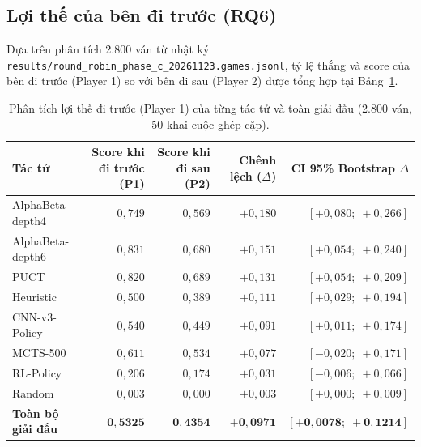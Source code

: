 \documentclass[11pt, a4paper]{article}
\begin{document}
\subsection{Lợi thế của bên đi trước (RQ6)}
Dựa trên phân tích 2.800 ván từ nhật ký \texttt{results/round\_robin\_phase\_c\_20261123.games.jsonl}, tỷ lệ thắng và score của bên đi trước (Player 1) so với bên đi sau (Player 2) được tổng hợp tại Bảng~\ref{tab:first_mover}.

\begin{table}[H]
    \centering
    \caption{Phân tích lợi thế đi trước (Player 1) của từng tác tử và toàn giải đấu (2.800 ván, 50 khai cuộc ghép cặp).}
    \label{tab:first_mover}
    \begin{tabular}{@{} l r r r r @{}}
        \toprule
        \textbf{Tác tử} & \textbf{Score khi đi trước (P1)} & \textbf{Score khi đi sau (P2)} & \textbf{Chênh lệch ($\Delta$)} & \textbf{CI 95\% Bootstrap $\Delta$} \\
        \midrule
        AlphaBeta-depth4 & $0{,}749$ & $0{,}569$ & $+0{,}180$ & $[+0{,}080;\; +0{,}266]$ \\
        AlphaBeta-depth6 & $0{,}831$ & $0{,}680$ & $+0{,}151$ & $[+0{,}054;\; +0{,}240]$ \\
        PUCT & $0{,}820$ & $0{,}689$ & $+0{,}131$ & $[+0{,}054;\; +0{,}209]$ \\
        Heuristic & $0{,}500$ & $0{,}389$ & $+0{,}111$ & $[+0{,}029;\; +0{,}194]$ \\
        CNN-v3-Policy & $0{,}540$ & $0{,}449$ & $+0{,}091$ & $[+0{,}011;\; +0{,}174]$ \\
        MCTS-500 & $0{,}611$ & $0{,}534$ & $+0{,}077$ & $[-0{,}020;\; +0{,}171]$ \\
        RL-Policy & $0{,}206$ & $0{,}174$ & $+0{,}031$ & $[-0{,}006;\; +0{,}066]$ \\
        Random & $0{,}003$ & $0{,}000$ & $+0{,}003$ & $[+0{,}000;\; +0{,}009]$ \\
        \midrule
        \textbf{Toàn bộ giải đấu} & $\mathbf{0{,}5325}$ & $\mathbf{0{,}4354}$ & $\mathbf{+0{,}0971}$ & $\mathbf{[+0{,}0078;\; +0{,}1214]}$ \\
        \bottomrule
    \end{tabular}
\end{table}
\end{document}
